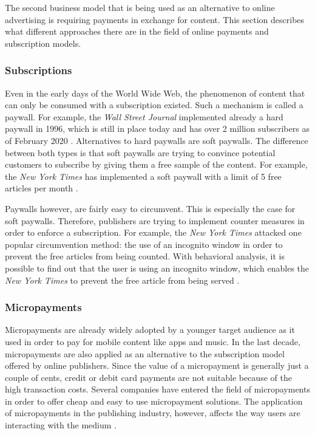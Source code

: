 The second business model that is being used as an alternative to online advertising is requiring payments in exchange for content. This section describes what different approaches there are in the field of online payments and subscription models.

\subsubsection{Subscriptions}

Even in the early days of the World Wide Web, the phenomenon of content that can only be consumed with a subscription existed. Such a mechanism is called a paywall. For example, the \textit{Wall Street Journal} implemented already a hard paywall in 1996, which is still in place today and has over 2 million subscribers as of February 2020 \cite{firstpaywall}.
Alternatives to hard paywalls are soft paywalls. The difference between both types is that soft paywalls are trying to convince potential customers to subscribe by giving them a free sample of the content. For example, the \textit{New York Times} has implemented a soft paywall with a limit of 5 free articles per month \cite{cook2012paying}.


Paywalls however, are fairly easy to circumvent. This is especially the case for soft paywalls. Therefore, publishers are trying to implement counter measures in order to enforce a subscription. For example, the \textit{New York Times} attacked one popular circumvention method: the use of an incognito window in order to prevent the free articles from being counted. With behavioral analysis, it is possible to find out that the user is using an incognito window, which enables the \textit{New York Times} to prevent the free article from being served \cite{troupson2015yes}.

\subsubsection{Micropayments}
Micropayments are already widely adopted by a younger target audience as it used in order to pay for mobile content like apps and music. In the last decade, micropayments are also applied as an alternative to the subscription model offered by online publishers. Since the value of a micropayment is generally just a couple of cents, credit or debit card payments are not suitable because of the high transaction costs. Several companies have entered the field of micropayments in order to offer cheap and easy to use micropayment solutions. The application of micropayments in the publishing industry, however, affects the way users are interacting with the medium \cite{geidner2015effects}.

